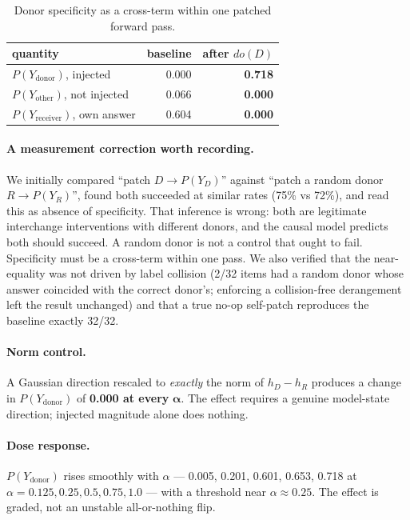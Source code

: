 \documentclass[11pt]{article}
\begin{document}
\begin{table}[t]
  \centering\small
  \begin{tabular}{lrr}
    \toprule
    quantity & baseline & after $do(D)$ \\
    \midrule
    $P(Y_{\text{donor}})$, injected     & 0.000 & \textbf{0.718} \\
    $P(Y_{\text{other}})$, not injected & 0.066 & \textbf{0.000} \\
    $P(Y_{\text{receiver}})$, own answer& 0.604 & \textbf{0.000} \\
    \bottomrule
  \end{tabular}
  \caption{Donor specificity as a cross-term within one patched forward pass.}
  \label{tab:specificity}
\end{table}

\paragraph{A measurement correction worth recording.}
We initially compared \enquote{patch $D \rightarrow P(Y_D)$} against
\enquote{patch a random donor $R \rightarrow P(Y_R)$}, found both succeeded at
similar rates (75\% vs 72\%), and read this as absence of specificity. That
inference is wrong: both are legitimate interchange interventions with
different donors, and the causal model predicts both should succeed. A random
donor is not a control that ought to fail. Specificity must be a cross-term
within one pass. We also verified that the near-equality was not driven by
label collision (2/32 items had a random donor whose answer coincided with the
correct donor's; enforcing a collision-free derangement left the result
unchanged) and that a true no-op self-patch reproduces the baseline exactly
32/32.

\paragraph{Norm control.}
A Gaussian direction rescaled to \emph{exactly} the norm of $h_D - h_R$
produces a change in $P(Y_{\text{donor}})$ of \textbf{0.000 at every}
$\boldsymbol{\alpha}$. The effect requires a genuine model-state direction;
injected magnitude alone does nothing.

\paragraph{Dose response.}
$P(Y_{\text{donor}})$ rises smoothly with $\alpha$ --- 0.005, 0.201, 0.601,
0.653, 0.718 at $\alpha = 0.125, 0.25, 0.5, 0.75, 1.0$ --- with a threshold
near $\alpha \approx 0.25$. The effect is graded, not an unstable
all-or-nothing flip.
\end{document}
